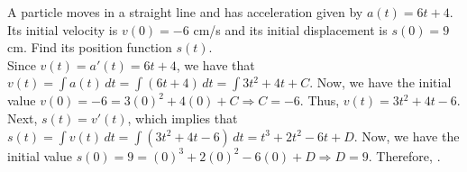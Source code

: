 \documentclass{book}
\begin{document}
\begin{Exam} A particle moves in a straight line and has acceleration given by $a(t) = 6t+4$. Its initial velocity is $v(0) = -6$ cm/s and its initial displacement is $s(0) = 9$ cm. Find its position function $s(t)$.\\

Since $v(t) = a'(t) = 6t+4$, we have that $v(t) = \int a(t)\,dt = \int (6t+4)\,dt = \int 3t^2 + 4t + C$. Now, we have the initial value $v(0) = -6 = 3(0)^2+4(0) + C \Rightarrow C = -6$. Thus, $v(t) = 3t^2 + 4t-6$. \\

Next, $s(t) = v'(t)$, which implies that $s(t) = \int v(t)\,dt = \int (3t^2 + 4t-6)\,dt = t^3 + 2t^2 -6t + D$. Now, we have the initial value $s(0) = 9 = (0)^3 + 2(0)^2 -6(0) + D \Rightarrow D = 9$. Therefore, . 
\end{Exam}\vs

\end{document}
